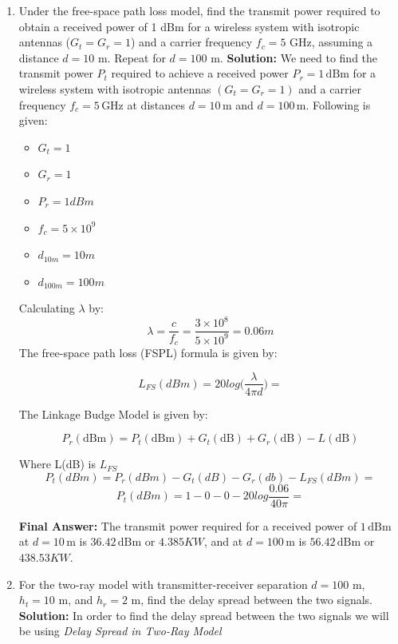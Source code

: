 \documentclass[a4paper,12pt]{book}
\begin{document}
	\begin{enumerate}
		\item Under the free-space path loss model, find the transmit power required to obtain a received power of 1 dBm for a wireless system with isotropic antennas ($G_t = G_r = 1$) and a carrier frequency $f_c = 5$ GHz, assuming a distance $d = 10$ m. Repeat for $d = 100$ m.
		\newline\newline\noindent
		\textbf{Solution:} We need to find the transmit power \( P_t \) required to achieve a received power \( P_r = 1 \, \text{dBm} \) for a wireless system with isotropic antennas \( (G_t = G_r = 1) \) and a carrier frequency \( f_c = 5 \, \text{GHz} \) at distances \( d = 10 \, \text{m} \) and \( d = 100 \, \text{m} \). Following is given:
		
		\begin{itemize}
			\item \(G_t = 1\)
			\item \(G_r = 1\)
			\item \(P_r = 1 dBm\)
			\item \(f_c = 5\times10^9\)
			\item \(d_{10m} = 10 m\)
			\item \(d_{100m} = 100 m\)
		\end{itemize}
		Calculating \(\lambda\) by:
		\[
			\lambda=\frac{c}{f_c}=\frac{3\times10^8}{5\times10^9}=0.06m
		\]
		The free-space path loss (FSPL) formula is given by:
		
		\[
			L_{FS}(dBm) = 20log\bigg(\frac{\lambda}{4\pi d}\bigg)=
		\]
		
		The Linkage Budge Model is given by:
		
		\[
		P_r (\text{dBm}) = P_t (\text{dBm}) + G_t (\text{dB}) + G_r (\text{dB}) - L (\text{dB})
		\]
		
		Where L(dB) is \(L_{FS}\)
		\newline\newline\noindent
		\[
			P_t(dBm)=P_r(dBm)-G_t(dB)-G_r(db)-L_{FS}(dBm)=
		\]
		\[
		P_t(dBm)=1-0-0-20log\frac{0.06}{40\pi}=
		\]
		
		
		\textbf{Final Answer:} The transmit power required for a received power of \( 1 \, \text{dBm} \) at \( d = 10 \, \text{m} \) is \( 36.42 \, \text{dBm} \) or \(4.385KW\), and at \( d = 100 \, \text{m} \) is \( 56.42 \, \text{dBm} \) or \(438.53KW\).
		
		\item For the two-ray model with transmitter-receiver separation $d = 100$ m, $h_t = 10$ m, and $h_r = 2$ m, find the delay spread between the two signals.
		\newline\newline\noindent\textbf{Solution:} In order to find the delay spread between the two signals we will be using \textit{Delay Spread in Two-Ray Model}
		

\end{enumerate}
\end{document}
